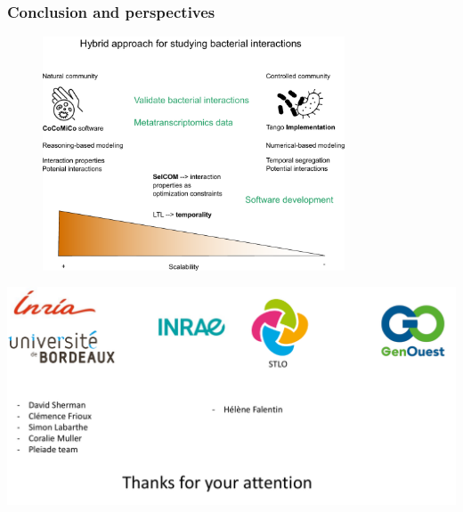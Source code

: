 \documentclass[8pt,usenames,dvipsnames]{beamer}
\begin{document}
\begin{frame}
\frametitle{Conclusion and perspectives}
\begin{figure}[H]
    \begin{center}
        \includegraphics[width=0.8\textwidth]{figures/perspective.pdf}
        \label{fig:explication}
    \end{center}
\end{figure}


\end{frame}

\begin{frame}
\includegraphics[width=\textwidth]{figures/merci.pdf}
\end{frame}
\end{document}
